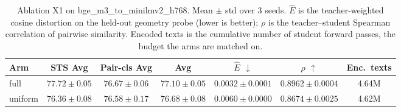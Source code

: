 \begin{table}[t]
\centering
\caption{Ablation X1 on bge\_m3\_to\_minilmv2\_h768. Mean $\pm$ std over 3 seeds. $\hat{E}$ is the teacher-weighted cosine distortion on the held-out geometry probe (lower is better); $\rho$ is the teacher--student Spearman correlation of pairwise similarity. Encoded texts is the cumulative number of student forward passes, the budget the arms are matched on.}
\label{tab:ablation_x1_bge_m3_to_minilmv2_h768}
\begin{tabular}{lcccccc}
\toprule
Arm & STS Avg & Pair-cls Avg & Avg & $\hat{E}$ $\downarrow$ & $\rho$ $\uparrow$ & Enc.\ texts \\
\midrule
full & $77.72 \pm 0.05$ & $76.67 \pm 0.06$ & $77.10 \pm 0.05$ & $0.0032 \pm 0.0001$ & $0.8962 \pm 0.0004$ & 4.64M \\
uniform & $76.36 \pm 0.08$ & $76.58 \pm 0.17$ & $76.68 \pm 0.08$ & $0.0060 \pm 0.0000$ & $0.8674 \pm 0.0025$ & 4.62M \\
\bottomrule
\end{tabular}
\end{table}
